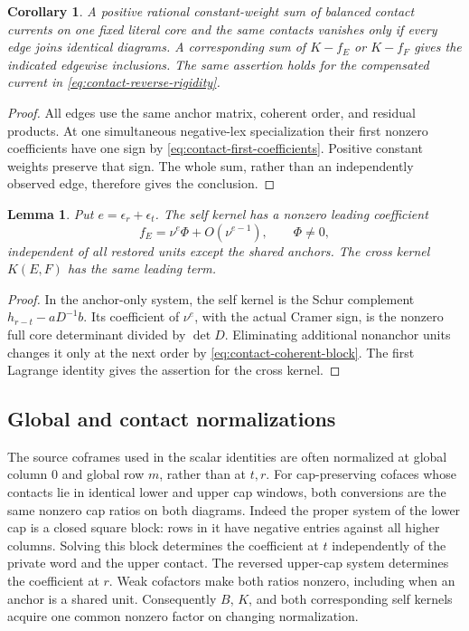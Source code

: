 \documentclass[11pt,a4paper]{amsart}
\numberwithin{equation}{section}
\theoremstyle{plain}
\newtheorem{lemma}[theorem]{Lemma}
\newtheorem{corollary}[theorem]{Corollary}
\theoremstyle{definition}
\begin{document}
\begin{corollary}\label{cor:contact-graph}
A positive rational constant-weight sum of balanced contact currents on
one fixed literal core and the same contacts vanishes only if every
edge joins identical diagrams.  A corresponding sum of \(K-f_E\) or \(K-f_F\)
gives the indicated edgewise inclusions.  The same assertion holds for
the compensated current in \eqref{eq:contact-reverse-rigidity}.
\end{corollary}
\begin{proof}
All edges use the same anchor matrix, coherent order, and residual
products.  At one simultaneous negative-lex specialization their first
nonzero coefficients have one sign by
\eqref{eq:contact-first-coefficients}.  Positive constant weights preserve
that sign.  The whole sum, rather than an independently observed edge,
therefore gives the conclusion.
\end{proof}

\begin{lemma}\label{lem:contact-self-limit}
Put \(e=\epsilon_r+\epsilon_t\).  The self kernel has a nonzero leading coefficient
\[
 f_E=\nu^{e}\Phi+O(\nu^{e-1}),\qquad \Phi\ne0,
\]
independent of all restored units except the shared anchors.  The cross
kernel \(K(E,F)\) has the same leading term.
\end{lemma}
\begin{proof}
In the anchor-only system, the self kernel is the Schur complement
\(h_{r-t}-aD^{-1}b\).  Its coefficient of \(\nu^e\), with the actual Cramer
sign, is the nonzero full core determinant divided by \(\det D\).
Eliminating additional nonanchor units changes it only at the next
order by \eqref{eq:contact-coherent-block}.  The first Lagrange identity
gives the assertion for the cross kernel.
\end{proof}

\subsection{Global and contact normalizations}

The source coframes used in the scalar identities are often normalized
at global column \(0\) and global row \(m\), rather than at \(t,r\).
For cap-preserving cofaces whose contacts lie in identical lower and
upper cap windows, both conversions are the same nonzero cap ratios on
both diagrams.  Indeed the proper system of the lower cap is a closed
square block: rows in it have negative entries against all higher
columns.  Solving this block determines the coefficient at \(t\)
independently of the private word and the upper contact.  The reversed
upper-cap system determines the coefficient at \(r\).  Weak cofactors make
both ratios nonzero, including when an anchor is a shared unit.
Consequently \(B\), \(K\), and both corresponding self kernels acquire one
common nonzero factor on changing normalization.
\end{document}
